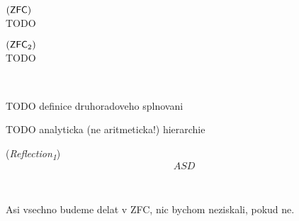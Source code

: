 \begin{definition}{$(\sf{ZFC})$}\label{def:zfc}\\
TODO
\end{definition}

\begin{definition}{$(\sf{ZFC\textsubscript{2}})$}\label{def:zfc_2}\\
TODO
\end{definition}

\

TODO definice druhoradoveho splnovani

TODO analyticka (ne aritmeticka!) hierarchie

\begin{definition}{(\emph{Reflection\textsubscript{1}})}\label{def:reflection_1}\\
\begin{equation}
ASD
\end{equation}
\end{definition}
\

Asi vsechno budeme delat v ZFC, nic bychom neziskali, pokud ne.
